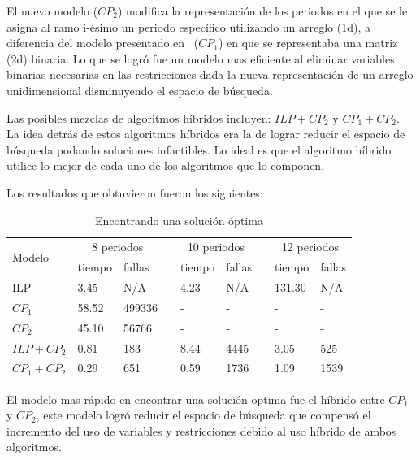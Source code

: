 \documentclass[letterpaper,10pt]{article}
\begin{document}
El nuevo modelo ($CP_2$) modifica la representación de los periodos en el que se le asigna al ramo i-ésimo un periodo específico utilizando un arreglo (1d), a diferencia del modelo presentado en~\cite{DBLP:journals/corr/cs-PL-0110007} ($CP_1$) en que se representaba una matriz (2d) binaria. Lo que se logró fue un modelo mas eficiente al eliminar variables binarias necesarias en las restricciones dada la nueva representación de un arreglo unidimensional disminuyendo el espacio de búsqueda.

Las posibles mezclas de algoritmos híbridos incluyen: $ILP + CP_2$ y $CP_1 + CP_2$. La idea detrás de estos algoritmos híbridos era la de lograr reducir el espacio de búsqueda podando soluciones infactibles. Lo ideal es que el algoritmo híbrido utilice lo mejor de cada uno de los algoritmos que lo componen.

Los resultados que obtuvieron fueron los siguientes:

\begin{table}[H]
  \centering
  \begin{tabular}{@{}lllcllcll@{}}
    \toprule[1.1pt]
    \multirow{2}{*}{Modelo} & \multicolumn{2}{c}{8 periodos} & \phantom{c} & \multicolumn{2}{c}{10 periodos} & \phantom{c}& \multicolumn{2}{c}{12 periodos}\\
    \cmidrule{2-3} \cmidrule{5-6} \cmidrule{8-9}
    & tiempo & fallas & \phantom{c} & tiempo & fallas & \phantom{c} & tiempo & fallas \\
    \midrule
    ILP & 3.45 & N/A & \phantom{c} & 4.23 & N/A & \phantom{c} & 131.30 & N/A \\
    $CP_1$ & 58.52 & 499336 & \phantom{c} & - & - & \phantom{c} & - & -\\
    $CP_2$ & 45.10 & 56766 & \phantom{c} & - & - & \phantom{c} & - & -\\
    $ILP + CP_2$ & 0.81 & 183 & \phantom{c} & 8.44  & 4445 & \phantom{c} & 3.05 & 525\\
    $CP_1 + CP_2$ & 0.29 & 651 & \phantom{c} & 0.59 & 1736 & \phantom{c} & 1.09 & 1539\\
    \bottomrule
  \end{tabular}
  \caption{Encontrando una solución óptima}
\end{table}

El modelo mas rápido en encontrar una solución optima fue el híbrido entre $CP_1$ y $CP_2$, este modelo logró reducir el espacio de búsqueda que compensó el incremento del uso de variables y restricciones debido al uso híbrido de ambos algoritmos.
\end{document}
